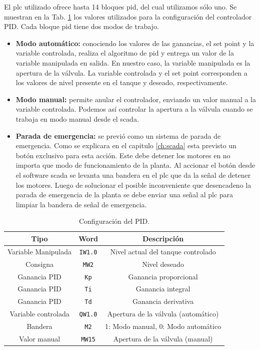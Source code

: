 El \gls{plc} utilizado ofrece hasta 14 bloques \gls{pid}, del cual utilizamos
sólo uno.
Se muestran en la Tab. \ref{table:controladorpid} los valores utilizados para
la configuración del controlador PID.
Cada bloque \gls{pid} tiene dos modos de trabajo.
\begin{itemize}
 \item \textbf{Modo automático:} conociendo los valores de las ganancias, el
set point y la variable controlada, realiza el algoritmo de \gls{pid} y entrega
un valor de la variable manipulada en salida.
En nuestro caso, la variable manipulada es la apertura de la válvula.
La variable controlada y el set point corresponden a los valores de nivel
presente en el tanque y deseado, respectivamente.
 \item \textbf{Modo manual:} permite anular el controlador, enviando un valor
manual a la variable controlada.
Podemos así controlar la apertura a la válvula cuando se
trabaja en modo manual desde el \gls{scada}.
 \item \textbf{Parada de emergencia:} se previó como un sistema de parada de emergencia.
 Como se explicara en el capitulo \ref{ch:scada} esta previsto un
 botón exclusivo para esta acción. Este debe detener
 los motores en no importa que modo de funcionamiento de la planta. Al accionar el 
 botón desde el software \gls{scada} se levanta una bandera en el \gls{plc} 
 que da la señal de detener los motores. Luego de solucionar el posible inconveniente
 que desencadeno la parada de emergencia de la planta se debe enviar una señal 
 al \gls{plc} para limpiar la bandera de señal de emergencia.
\end{itemize}

\begin{table}[!t]
\renewcommand{\arraystretch}{1.3}
\centering
\begin{tabular}{c||c||c}
\hline
\bfseries Tipo & \bfseries Word  & \bfseries Descripción\\
\hline \hline
Variable Manipulada & \verb|IW1.0|  & Nivel actual del tanque controlado\\
Consigna & \verb|MW2|  & Nivel deseado\\
Ganancia PID & \verb|Kp|  & Ganancia proporcional\\
Ganancia PID & \verb|Ti|  & Ganancia integral\\
Ganancia PID & \verb|Td|  & Ganancia derivativa\\
Variable controlada & \verb|QW1.0|  &  Apertura de la válvula (automático)\\
Bandera & \verb|M2|  & 1: Modo manual, 0: Modo automático \\
Valor manual & \verb|MW15|  & Apertura de la válvula (manual)\\
\hline
\end{tabular}
\caption{Configuración del PID.}
\label{table:controladorpid}
\end{table}

